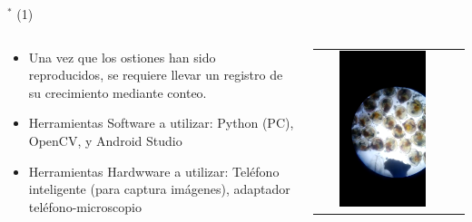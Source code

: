 
\begin{frame}{$^*$  (1)}

\begin{columns}
\begin{column}{0.70\textwidth}
	\begin{itemize}
		\item Una vez que los ostiones han sido reproducidos, se requiere llevar un registro de su crecimiento mediante conteo. 
        \item Herramientas Software a utilizar: Python (PC), OpenCV, y Android Studio
        \item Herramientas Hardwware a utilizar: Teléfono inteligente (para captura imágenes), adaptador teléfono-microscopio
	\end{itemize}
\end{column}
\begin{column}{0.30\textwidth}  
\begin{center}
     \begin{tabular}{cc}
         \includegraphics[width=0.68\textwidth]{2022_ConteoOstioncitos/figs/R0063.png}\\         
      \end{tabular}
\end{center}
\end{column} 
\end{columns} 



\end{frame}
